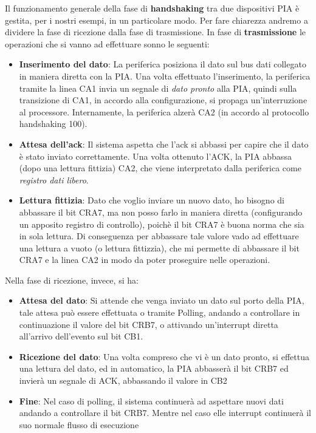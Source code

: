 Il funzionamento generale della fase di \textbf{handshaking} tra due dispositivi PIA è gestita, per i nostri esempi, in un particolare modo.
Per fare chiarezza andremo a dividere la fase di ricezione dalla fase di trasmissione.
In fase di \textbf{trasmissione} le operazioni che si vanno ad effettuare sonno le seguenti:
\begin{itemize}
    \item \textbf{Inserimento del dato}: La periferica posiziona il dato sul bus dati collegato in maniera diretta con la PIA. Una volta effettuato l'inserimento, la periferica tramite la linea CA1 invia un segnale di \textit{dato pronto} alla PIA, quindi sulla transizione di CA1, in accordo alla configurazione, si propaga un'interruzione al processore. Internamente, la periferica alzerà CA2 (in accordo al protocollo handshaking 100).
    \item \textbf{Attesa dell'ack}: Il sistema aspetta che l'ack si abbassi per capire che il dato è stato inviato correttamente. Una volta ottenuto l'ACK, la PIA abbassa (dopo una lettura fittizia) CA2, che viene interpretato dalla periferica come \textit{registro dati libero}.
    \item \textbf{Lettura fittizia}: Dato che voglio inviare un nuovo dato, ho bisogno di abbassare il bit CRA7, ma non posso farlo in maniera diretta (configurando un apposito registro di controllo), poichè il bit CRA7 è buona norma che sia in sola lettura. Di conseguenza per abbassare tale valore vado ad effettuare una lettura a vuoto (o lettura fittizzia), che mi permette di abbassare il bit CRA7 e la linea CA2 in modo da poter proseguire nelle operazioni.
\end{itemize}

Nella fase di ricezione, invece, si ha:
\begin{itemize}
    \item \textbf{Attesa del dato}: Si attende che venga inviato un dato sul porto della PIA, tale attesa può essere effettuata o tramite Polling, andando a controllare in continuazione il valore del bit CRB7, o attivando un'interrupt diretta all'arrivo dell'evento sul bit CB1.
    
    \item \textbf{Ricezione del dato}: Una volta compreso che vi è un dato pronto, si effettua una lettura del dato, ed in automatico, la PIA abbasserà il bit CRB7 ed invierà un segnale di ACK, abbassando il valore in CB2

    \item \textbf{Fine}: Nel caso di polling, il sistema continuerà ad aspettare nuovi dati andando a controllare il bit CRB7. Mentre nel caso elle interrupt continuerà il suo normale flusso di esecuzione
\end{itemize}

